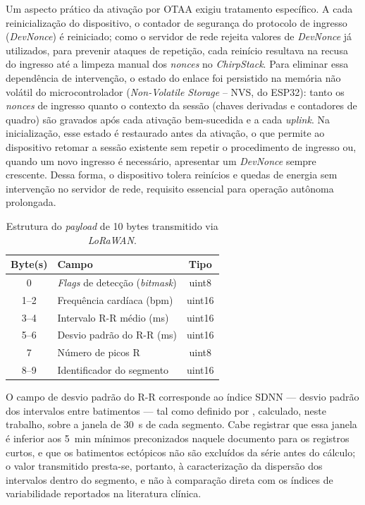 Um aspecto prático da ativação por \acs{OTAA} exigiu tratamento específico. A cada reinicialização do dispositivo, o contador de segurança do protocolo de ingresso (\textit{DevNonce}) é reiniciado; como o servidor de rede rejeita valores de \textit{DevNonce} já utilizados, para prevenir ataques de repetição, cada reinício resultava na recusa do ingresso até a limpeza manual dos \textit{nonces} no \textit{ChirpStack}. Para eliminar essa dependência de intervenção, o estado do enlace foi persistido na memória não volátil do microcontrolador (\textit{Non-Volatile Storage} -- NVS, do ESP32): tanto os \textit{nonces} de ingresso quanto o contexto da sessão (chaves derivadas e contadores de quadro) são gravados após cada ativação bem-sucedida e a cada \textit{uplink}. Na inicialização, esse estado é restaurado antes da ativação, o que permite ao dispositivo retomar a sessão existente sem repetir o procedimento de ingresso ou, quando um novo ingresso é necessário, apresentar um \textit{DevNonce} sempre crescente. Dessa forma, o dispositivo tolera reinícios e quedas de energia sem intervenção no servidor de rede, requisito essencial para operação autônoma prolongada.

\begin{table}[h]
    \centering
    \caption{Estrutura do \textit{payload} de 10 bytes transmitido via \textit{LoRaWAN}.}
    \begin{tabular}{c|l|c}
        \textbf{Byte(s)} & \textbf{Campo} & \textbf{Tipo} \\ \hline
        0 & \textit{Flags} de detecção (\textit{bitmask}) & uint8 \\ \hline
        1--2 & Frequência cardíaca (bpm) & uint16 \\ \hline
        3--4 & Intervalo R-R médio (ms) & uint16 \\ \hline
        5--6 & Desvio padrão do R-R (ms) & uint16 \\ \hline
        7 & Número de picos R & uint8 \\ \hline
        8--9 & Identificador do segmento & uint16 \\ \hline
    \end{tabular}
    \label{tab:payload}
\end{table}

O campo de desvio padrão do R-R corresponde ao índice \acs{SDNN} --- desvio padrão dos intervalos entre batimentos --- tal como definido por , calculado, neste trabalho, sobre a janela de 30~s de cada segmento. Cabe registrar que essa janela é inferior aos 5~min mínimos preconizados naquele documento para os registros curtos, e que os batimentos ectópicos não são excluídos da série antes do cálculo; o valor transmitido presta-se, portanto, à caracterização da dispersão dos intervalos dentro do segmento, e não à comparação direta com os índices de variabilidade reportados na literatura clínica.


